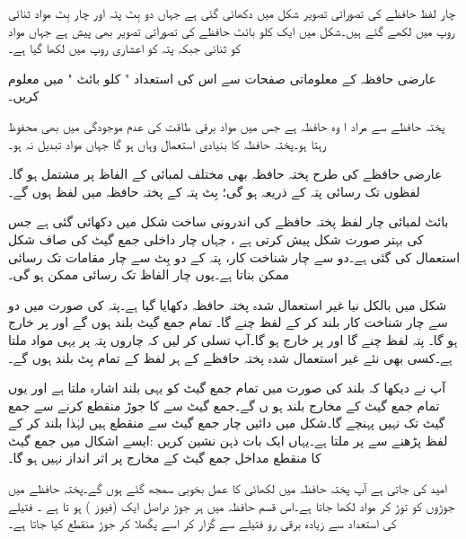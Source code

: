 چار  لفظ  حافظے کی تصوراتی تصویر شکل  میں دکھائی گئی ہے جہاں دو بِٹ پتہ اور چار بِٹ مواد   ثنائی  روپ میں لکھے    گئے   ہیں۔شکل میں ایک کلو بائٹ حافظے کی تصوراتی تصویر بھی  پیش ہے جہاں مواد کو ثنائی جبکہ پتہ کو اعشاری  روپ میں لکھا گیا ہے۔

عارضی حافظہ  کے معلوماتی صفحات سے اس کی  استعداد "  کلو بائٹ " میں   معلوم  کریں۔



پختہ حافظے سے مراد ا وہ حافظہ ہے جس میں مواد برقی طاقت کی عدم موجودگی میں بھی محفوظ رہتا ہو۔پختہ حافظہ کا بنیادی استعمال وہاں ہو گا جہاں مواد تبدیل نہ ہو۔

عارضی حافظے کی طرح پختہ حافظہ بھی مختلف لمبائی کے الفاظ پر مشتمل ہو گا۔لفظوں تک رسائی   پتہ کے ذریعہ  ہو گی؛  بِٹ پتہ کے پختہ حافظہ میں   لفظ ہوں گے۔

بائٹ لمبائی  چار  لفظ  پختہ حافظے  کی اندرونی ساخت شکل  میں دکھائی گئی ہے جس کی بہتر صورت  شکل   پیش کرتی ہے ،  جہاں چار داخلی جمع گیٹ کی صاف شکل استعمال کی گئی ہے۔دو سے چار شناخت کار، پتہ کے دو بِٹ سے چار مقامات  تک رسائی ممکن بناتا ہے۔یوں چار الفاظ تک رسائی ممکن ہو گی۔



شکل   میں بالکل نیا غیر استعمال شدہ پختہ حافظہ دکھایا گیا ہے۔پتہ      کی صورت میں دو سے چار شناخت کار   بلند کر کے لفظ   چنے گا۔ تمام جمع گیٹ بلند ہوں گے اور  پر  خارج ہو گا۔ پتہ   لفظ   چنے گا اور  پر  خارج ہو گا۔آپ تسلی کر لیں کہ چاروں پتہ پر یہی مواد ملتا ہے۔کسی بھی نئے غیر استعمال شدہ پختہ حافظے کے ہر لفظ کے تمام بِٹ بلند   ہوں گے۔


آپ نے دیکھا کہ    بلند  کی صورت میں تمام جمع گیٹ کو یہی بلند اشارہ ملتا ہے اور یوں تمام جمع گیٹ کے مخارج بلند ہو ں گے۔جمع گیٹ سے    کا جوڑ منقطع  کرنے سے     جمع گیٹ تک نہیں  پہنچے  گا۔شکل  میں دائیں چار جمع گیٹ  سے منقطع  ہیں لہٰذا  بلند کر کے لفظ  پڑھنے سے    پر  ملتا ہے۔یہاں ایک بات ذہن  نشین کریں :ایسے اشکال میں  جمع گیٹ کا منقطع مداخل جمع گیٹ کے مخارج پر اثر  انداز نہیں ہو گا۔

امید کی جاتی ہے آپ پختہ حافظہ میں لکھائی کا عمل بخوبی سمجھ گئے ہوں گے۔پختہ حافظے میں  جوڑوں کو توڑ کر مواد لکھا جاتا ہے۔اس قسم حافظہ میں ہر جوڑ دراصل ایک (فیوز  ) ہو تا ہے ۔ فتیلے  کی استعداد  سے زیادہ برقی رو  فتیلے سے گزار کر اسے پگھلا کر  جوڑ   منقطع  کیا   جاتا ہے۔


